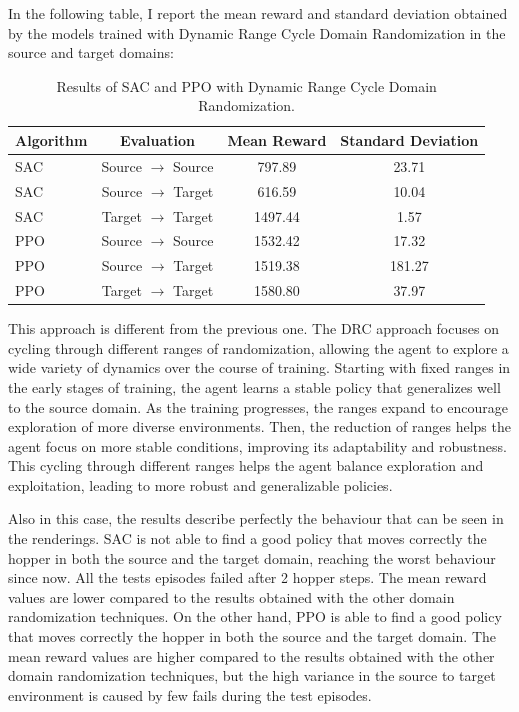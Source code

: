 \documentclass[12pt]{article}
\begin{document}
In the following table, I report the mean reward and standard deviation obtained by the models trained with Dynamic Range Cycle Domain Randomization in the source and target domains:

\begin{table}[H]
    \centering
    \begin{tabular}{|l|c|c|c|}
        \hline
        \textbf{Algorithm} & \textbf{Evaluation} & \textbf{Mean Reward} & \textbf{Standard Deviation} \\ \hline
        SAC & Source $\rightarrow$ Source & 797.89 & 23.71 \\ 
        SAC & Source $\rightarrow$ Target & 616.59 & 10.04 \\ 
        SAC & Target $\rightarrow$ Target & 1497.44 & 1.57 \\ \hline
        PPO & Source $\rightarrow$ Source & 1532.42 & 17.32 \\ 
        PPO & Source $\rightarrow$ Target & 1519.38 & 181.27 \\ 
        PPO & Target $\rightarrow$ Target & 1580.80 & 37.97 \\ \hline
    \end{tabular}
    \caption{Results of SAC and PPO with Dynamic Range Cycle Domain Randomization.}
    \label{tab:results_drc}
\end{table}

This approach is different from the previous one. The DRC approach focuses on cycling through different ranges of randomization, allowing the agent to explore a wide variety of dynamics over the course of training. Starting with fixed ranges in the early stages of training, the agent learns a stable policy that generalizes well to the source domain. As the training progresses, the ranges expand to encourage exploration of more diverse environments. Then, the reduction of ranges helps the agent focus on more stable conditions, improving its adaptability and robustness. This cycling through different ranges helps the agent balance exploration and exploitation, leading to more robust and generalizable policies.

Also in this case, the results describe perfectly the behaviour that can be seen in the renderings. SAC is not able to find a good policy that moves correctly the hopper in both the source and the target domain, reaching the worst behaviour since now. All the tests episodes failed after 2 hopper steps. The mean reward values are lower compared to the results obtained with the other domain randomization techniques. On the other hand, PPO is able to find a good policy that moves correctly the hopper in both the source and the target domain. The mean reward values are higher compared to the results obtained with the other domain randomization techniques, but the high variance in the source to target environment is caused by few fails during the test episodes.
\end{document}
